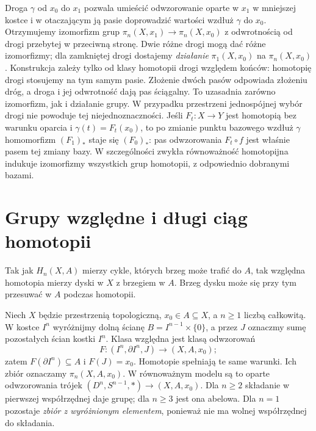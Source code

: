 \begin{uwaga}
Droga $\gamma$ od $x_0$ do $x_1$
pozwala umieścić odwzorowanie oparte w $x_1$
w mniejszej kostce i w otaczającym
ją pasie doprowadzić wartości
wzdłuż $\gamma$ do $x_0$.
Otrzymujemy izomorfizm grup
$\pi_n(X,x_1)\to\pi_n(X,x_0)$
z odwrotnością od drogi
przebytej w przeciwną stronę.
Dwie różne drogi mogą dać
różne izomorfizmy; dla zamkniętej
drogi dostajemy \emph{działanie}
$\pi_1(X,x_0)$ na $\pi_n(X,x_0)$.
Konstrukcja zależy tylko od klasy homotopii drogi względem końców:
homotopię drogi stosujemy na tym samym pasie. Złożenie dwóch pasów
odpowiada złożeniu dróg, a droga i jej odwrotność dają pas ściągalny.
To uzasadnia zarówno izomorfizm, jak i działanie grupy.
W przypadku przestrzeni jednospójnej wybór drogi
nie powoduje tej niejednoznaczności.
Jeśli $F_t:X\to Y$ jest homotopią bez warunku oparcia i
$\gamma(t)=F_t(x_0)$, to po zmianie punktu bazowego wzdłuż $\gamma$
homomorfizm $(F_1)_*$ staje się $(F_0)_*$: pas odwzorowania
$F_t\circ f$ jest właśnie pasem tej zmiany bazy.
W szczególności zwykła równoważność homotopijna indukuje
izomorfizmy wszystkich grup homotopii, z odpowiednio dobranymi bazami.
\end{uwaga}

\section{Grupy względne i długi ciąg homotopii}
\label{sec:pi-wzgledne}

Tak jak $H_n(X,A)$ mierzy cykle,
których brzeg może trafić do $A$,
tak względna homotopia mierzy
dyski w $X$ z brzegiem w $A$.
Brzeg dysku może się przy tym
przesuwać w $A$ podczas homotopii.

\begin{definicja}
\label{def:pi-wzgledne}
Niech $X$ będzie przestrzenią topologiczną,
$x_0\in A\subseteq X$, a $n\geq1$ liczbą całkowitą.
W kostce $I^n$ wyróżnijmy
dolną ścianę $B=I^{n-1}\times\{0\}$,
a przez $J$ oznaczmy sumę
pozostałych ścian kostki $I^n$.
Klasa względna jest klasą odwzorowań
\[
 F:(I^n,\partial I^n,J)
       \longrightarrow(X,A,x_0);
\]
zatem $F(\partial I^n)\subseteq A$
i $F(J)=x_0$. Homotopie spełniają
te same warunki. Ich zbiór oznaczamy
$\pi_n(X,A,x_0)$.
W równoważnym modelu są to
oparte odwzorowania trójek
$(D^n,S^{n-1},*)\to(X,A,x_0)$.
Dla $n\geq2$ składanie w pierwszej
współrzędnej daje grupę; dla
$n\geq3$ jest ona abelowa.
Dla $n=1$ pozostaje \emph{zbiór
z wyróżnionym elementem},
ponieważ nie ma wolnej współrzędnej
do składania.
\end{definicja}

